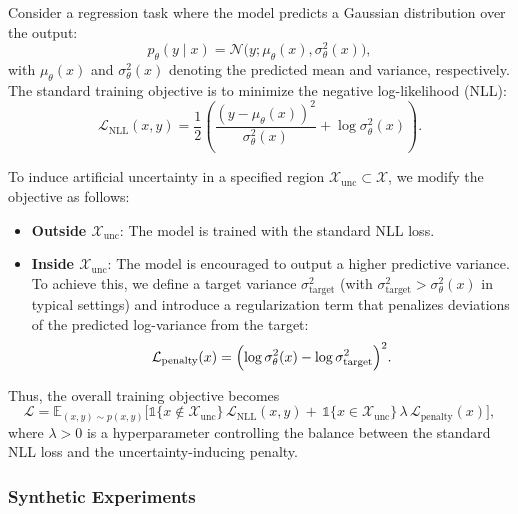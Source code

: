 Consider a regression task where the model predicts a Gaussian distribution over the output:
\begin{equation}
p_\theta(y \mid x) = \mathcal{N}\bigl(y; \mu_\theta(x), \sigma^2_\theta(x)\bigr),
\end{equation}
with \(\mu_\theta(x)\) and \(\sigma^2_\theta(x)\) denoting the predicted mean and variance, respectively. The standard training objective is to minimize the negative log-likelihood (NLL):
\begin{equation}
\mathcal{L}_{\text{NLL}}(x,y) = \frac{1}{2} \left( \frac{(y-\mu_\theta(x))^2}{\sigma^2_\theta(x)} + \log \sigma^2_\theta(x) \right).
\end{equation}

To induce artificial uncertainty in a specified region \(\mathcal{X}_{\text{unc}} \subset \mathcal{X}\), we modify the objective as follows:
\begin{itemize}
    \item \textbf{Outside \(\mathcal{X}_{\text{unc}}\)}: The model is trained with the standard NLL loss.
    \item \textbf{Inside \(\mathcal{X}_{\text{unc}}\)}: The model is encouraged to output a higher predictive variance. To achieve this, we define a target variance \(\sigma^2_{\text{target}}\) (with \(\sigma^2_{\text{target}} > \sigma^2_\theta(x)\) in typical settings) and introduce a regularization term that penalizes deviations of the predicted log-variance from the target:
    \begin{equation}
    \mathcal{L}_{\text{penalty}}(x) = \Bigl(\log \sigma^2_\theta(x) - \log \sigma^2_{\text{target}}\Bigr)^2.
    \end{equation}
\end{itemize}
Thus, the overall training objective becomes
\begin{equation}
\mathcal{L} = \mathbb{E}_{(x,y) \sim p(x,y)} \Biggl[
\mathds{1}\{x \notin \mathcal{X}_{\text{unc}}\}\, \mathcal{L}_{\text{NLL}}(x,y)
+\,
\mathds{1}\{x \in \mathcal{X}_{\text{unc}}\}\, \lambda\, \mathcal{L}_{\text{penalty}}(x)
\Biggr],
\end{equation}
where \(\lambda > 0\) is a hyperparameter controlling the balance between the standard NLL loss and the uncertainty-inducing penalty.

\subsubsection{Synthetic Experiments}

